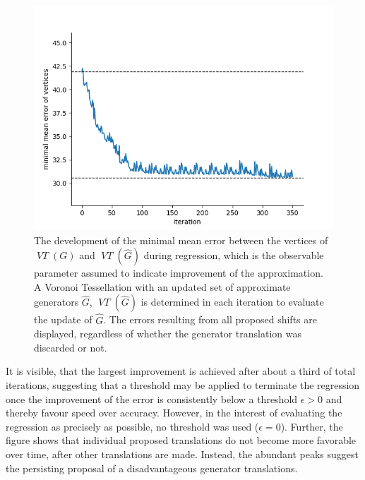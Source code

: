 \documentclass[a4paper]{article}
\DeclareMathOperator*{\VT}{\textit{VT}}
\begin{document}
\begin{figure}[H]
	\includegraphics[width=\textwidth]{generator_approximation_error.png}
	\caption{The development of the minimal mean error between the vertices of \(\VT(G)\) and \(\VT(\hat{G})\)
		during regression, which is the observable parameter assumed to indicate improvement of the approximation.
		A Voronoi Tessellation with an updated set of approximate generators \(\hat{G}\),
		\(\VT(\hat{G})\) is determined in each iteration to evaluate the update of \(\hat{G}\).
		The errors resulting from all proposed shifts are displayed, regardless of whether the generator translation
		was  discarded or not.}
\end{figure}

It is visible, that the largest improvement is achieved after about a third of total iterations, suggesting
that a threshold may be applied to terminate the regression
once the improvement of the error is consistently below a threshold \(\epsilon > 0\) and thereby favour speed over accuracy.
However, in the interest of evaluating the regression as precisely as possible, no threshold was used (\(\epsilon = 0\)).
Further, the figure shows that individual proposed translations do not become more favorable over time,
after other translations are made. Instead, the abundant peaks suggest the persisting proposal of a disadvantageous
generator translations.
\end{document}
